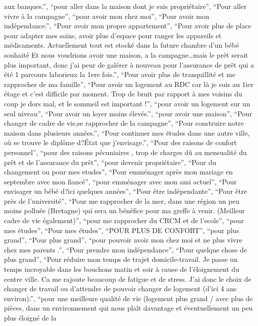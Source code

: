 \documentclass[
  letterpaper,
  DIV=11,
  numbers=noendperiod]{scrartcl}
\begin{document}
\begin{itemize}
  aux banques.'', ``pour aller dans la maison dont je suis
  propriétaire'', ``Pour aller vivre à la campagne'', ``pour avoir mon
  chez moi'', ``Pour avoir mon indépendance.'', ``Pour avoir mon propre
  appartement'', ``Pour avoir plus de place pour adapter mes soins,
  avoir plus d'espace pour ranger les appareils et médicaments.
  Actuellement tout est stocké dans la future chambre d'un bébé souhaité
  Et nous voudrions avoir une maison, a la campagne\ldots mais le prêt
  serait plus important, donc j'ai peur de galérer à nouveau pour
  l'assurance de prêt qui a été 1 parcours laborieux la 1ere fois.'',
  ``Pour avoir plus de tranquillité et me rapprocher de ma famille'',
  ``Pour avoir un logement au RDC car là je suis au 1ier étage et c'est
  difficile par moment. Trop de bruit par rapport à mes voisins du coup
  je dors mal, et le sommeil est important !'', ``pour avoir un logement
  sur un seul niveau'', ``Pour avoir un loyer moins élevés.'', ``pour
  avoir une maison'', ``Pour changer de cadre de vie,se rapprocher de la
  campagne'', ``Pour construire notre maison dans plusieurs années.'',
  ``Pour continuer mes études dans une autre ville, où se trouve le
  diplôme d?État que j'envisage.'', ``Pour des raisons de confort
  personnel'', ``pour des raisons pécuniaires , trop de charges dû au
  mensualité du prêt et de l'assurance du prêt'', ``pour devenir
  propriétaire'', ``Pour du changement ou pour mes etudes'', ``Pour
  emménager après mon mariage en septembre avec mon fiancé'', ``pour
  emménager avec mon ami actuel'', ``Pour envisager un bébé d?ici
  quelques années'', ``Pour être indépendante'', ``Pour être près de
  l'université'', ``Pour me rapprocher de la mer, dans une région un peu
  moins polluée (Bretagne) qui sera un bénéfice pour ma greffe à venir.
  (Meilleur cadre de vie également)'', ``pour me rapprocher du CRCM et
  de l'ecole'', ``pour mes études'', ``Pour mes études'', ``POUR PLUS DE
  CONFORT'', ``pour plus grand'', ``Pour plus grand'', ``pour pouvoir
  avoir mon chez moi et ne plus vivre chez mes parents .'', ``Pour
  prendre mon indépendance'', ``Pour quelque chose de plus grand'',
  ``Pour réduire mon temps de trajet domicile-travail. Je passe un temps
  incroyable dans les bouchons matin et soir à cause de l'éloignement du
  centre ville. Ca me rajoute beaucoup de fatigue et de stress. J'ai
  donc le choix de changer de travail ou d'attendre de pouvoir changer
  de logement (d'ici 4 ans environ).'', ``pour une meilleure qualité de
  vie (logement plus grand / avec plus de pièces, dans un environnement
  qui nous plaît davantage et éventuellement un peu plus éloigné de la

\end{itemize}
\end{document}
